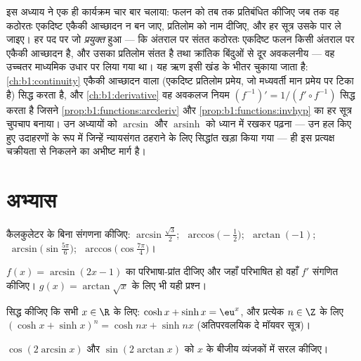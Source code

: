 \begin{remark}[मध्यांतर: प्रतिलोम-फलन कार्यक्रम]\label{rem:b1:functions:interlude}
इस अध्याय ने एक ही कार्यक्रम चार बार चलाया: फलन को तब तक प्रतिबंधित कीजिए जब
तक वह कठोरतः एकदिष्ट एकैकी आच्छादन न बन जाए, प्रतिलोम को नाम दीजिए, और हर
सूत्र उसके पार ले जाइए। हर पद पर जो \emph{प्रयुक्त} हुआ --- कि अंतराल पर
संतत कठोरतः एकदिष्ट फलन किसी अंतराल पर एकैकी आच्छादन है, और उसका प्रतिलोम
संतत है तथा क्रांतिक बिंदुओं से दूर अवकलनीय --- वह उच्चतर माध्यमिक उधार पर
लिया गया था। यह ऋण इसी खंड के भीतर चुकाया जाता है: \cref{ch:b1:continuity}
एकैकी आच्छादन वाला  (एकदिष्ट प्रतिलोम प्रमेय, जो मध्यवर्ती मान प्रमेय पर
टिका है) सिद्ध करता है, और \cref{ch:b1:derivative} वह अवकलज नियम $(f^{-1})'
= 1/(f' \circ f^{-1})$ सिद्ध करता है जिसने \cref{prop:b1:functions:arcderiv}
और \cref{prop:b1:functions:invhyp} का हर सूत्र चुपचाप बनाया। उन अध्यायों को
$\arcsin$ और $\operatorname{arsinh}$ को ध्यान में रखकर पढ़ना --- उन हल किए
हुए उदाहरणों के रूप में जिन्हें न्यायसंगत ठहराने के लिए सिद्धांत खड़ा किया
गया --- ही इस प्रत्यक्ष चक्रीयता से निकलने का अभीष्ट मार्ग है।
\end{remark}

\section{अभ्यास}

\begin{exercise}[$\star$]\label{exo:b1:functions:1}
कैलकुलेटर के बिना संगणना कीजिए: $\arcsin\frac{\sqrt 3}{2}$;
$\;\arccos\bigl(-\frac 12\bigr)$; $\;\arctan(-1)$;
$\;\arcsin\bigl(\sin\frac{5\pi}{6}\bigr)$;
$\;\arccos\bigl(\cos\frac{7\pi}{4}\bigr)$।
\end{exercise}

\begin{exercise}[$\star$]\label{exo:b1:functions:2}
$f(x) = \arcsin(2x - 1)$ का परिभाषा-प्रांत दीजिए और जहाँ परिभाषित हो वहाँ
$f'$ संगणित कीजिए। $g(x) = \arctan\sqrt{x}$ के लिए भी यही प्रश्न।
\end{exercise}

\begin{exercise}[$\star$]\label{exo:b1:functions:3}
सिद्ध कीजिए कि सभी $x \in \R$ के लिए: $\cosh x + \sinh x = \eu^x$, और
प्रत्येक $n \in \Z$ के लिए $(\cosh x + \sinh x)^n = \cosh nx + \sinh nx$
(अतिपरवलयिक दे मॉयवर सूत्र)।
\end{exercise}

\begin{exercise}[$\star$]\label{exo:b1:functions:4}
$\cos(2\arcsin x)$ और $\sin(2\arctan x)$ को $x$ के बीजीय व्यंजकों में सरल
कीजिए।
\end{exercise}

